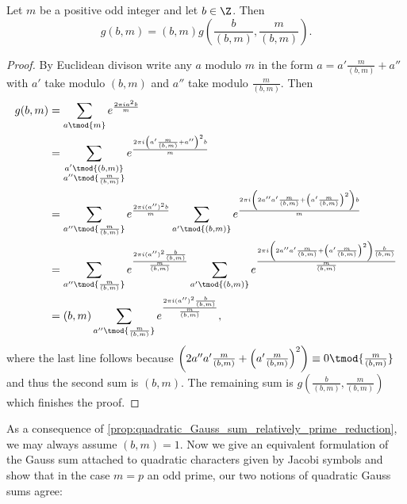         \begin{proposition}\label{prop:quadratic_Gauss_sum_relatively_prime_reduction}
          Let $m$ be a positive odd integer and let $b \in \Z$. Then
          \[
            g(b,m) = (b,m)g\left(\frac{b}{(b,m)},\frac{m}{(b,m)}\right).
          \]
        \end{proposition}
        \begin{proof}
          By Euclidean divison write any $a$ modulo $m$ in the form $a = a'\frac{m}{(b,m)}+a''$ with $a'$ take modulo $(b,m)$ and $a''$ take modulo $\frac{m}{(b,m)}$. Then
          \begin{align*}
            g(b,m) &= \sum_{a \tmod{m}}e^{\frac{2\pi ia^{2}b}{m}} \\
            &= \sum_{\substack{a' \tmod{(b,m)} \\ a'' \tmod{\frac{m}{(b,m)}}}}e^{\frac{2\pi i\left(a'\frac{m}{(b,m)}+a''\right)^{2}b}{m}} \\
            &= \sum_{a'' \tmod{\frac{m}{(b,m)}}}e^{\frac{2\pi i(a'')^{2}b}{m}}\sum_{a' \tmod{(b,m)}}e^{\frac{2\pi i\left(2a''a'\frac{m}{(b,m)}+\left(a'\frac{m}{(b,m)}\right)^{2}\right)b}{m}} \\
            &= \sum_{a'' \tmod{\frac{m}{(b,m)}}}e^{\frac{2\pi i(a'')^{2}\frac{b}{(b,m)}}{\frac{m}{(b,m)}}}\sum_{a' \tmod{(b,m)}}e^{\frac{2\pi i\left(2a''a'\frac{m}{(b,m)}+\left(a'\frac{m}{(b,m)}\right)^{2}\right)\frac{b}{(b,m)}}{\frac{m}{(b,m)}}} \\
            &= (b,m)\sum_{a'' \tmod{\frac{m}{(b,m)}}}e^{\frac{2\pi i(a'')^{2}\frac{b}{(b,m)}}{\frac{m}{(b,m)}}},
          \end{align*}
          where the last line follows because $\left(2a''a'\frac{m}{(b,m)}+\left(a'\frac{m}{(b,m)}\right)^{2}\right) \equiv 0 \tmod{\frac{m}{(b,m)}}$ and thus the second sum is $(b,m)$. The remaining sum is $g\left(\frac{b}{(b,m)},\frac{m}{(b,m)}\right)$ which finishes the proof.
        \end{proof}

        As a consequence of \cref{prop:quadratic_Gauss_sum_relatively_prime_reduction}, we may always assume $(b,m) = 1$. Now we give an equivalent formulation of the Gauss sum attached to quadratic characters given by Jacobi symbols and show that in the case $m = p$ an odd prime, our two notions of quadratic Gauss sums agree:

